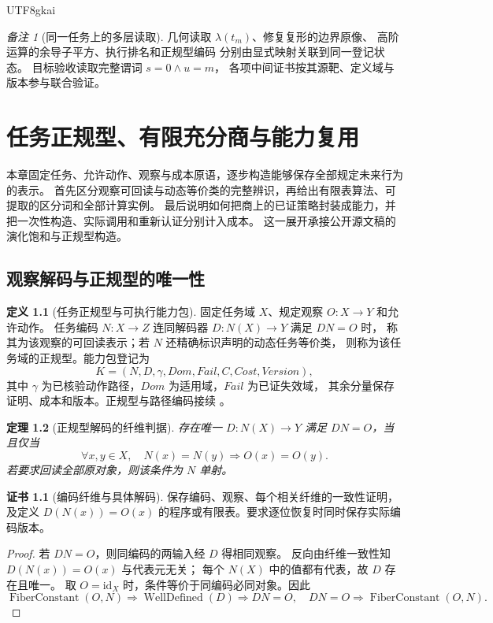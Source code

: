 \documentclass[12pt,a4paper,openany,notitlepage]{report}
\theoremstyle{plain}
\newtheorem{theorem}{定理}[chapter]
\theoremstyle{definition}
\newtheorem{definition}[theorem]{定义}
\newtheorem*{certificate}{证书}
\theoremstyle{remark}
\newtheorem{remark}[theorem]{备注}
\def\mathcal#1{#1}\def\mathsf#1{#1}\def\mathbb#1{#1}%
\begin{document}
\begin{CJK*}{UTF8}{gkai}
\begin{remark}[同一任务上的多层读取]
几何读取 $\lambda(t_m)$、修复复形的边界原像、
高阶运算的余导子平方、执行排名和正规型编码
分别由显式映射关联到同一登记状态。
目标验收读取完整谓词 $s=0\land u=m$，
各项中间证书按其源靶、定义域与版本参与联合验证。
\end{remark}


\chapter{任务正规型、有限充分商与能力复用}
\label{exp:ch:normalform}

\label{hgov:sec:normalform}

本章固定任务、允许动作、观察与成本原语，逐步构造能够保存全部规定未来行为的表示。
首先区分观察可回读与动态等价类的完整辨识，再给出有限表算法、可提取的区分词和全部计算实例。
最后说明如何把商上的已证策略封装成能力，并把一次性构造、实际调用和重新认证分别计入成本。
这一展开承接公开源文稿的演化饱和与正规型构造\cite{S19,S38,GFrameworkSynthesis}。

\section{观察解码与正规型的唯一性}
\label{exp:gov:normalform-section}

\begin{definition}[任务正规型与可执行能力包]
\label{hgov:def:normalform}
固定任务域 $X$、规定观察 $O:X\to Y$ 和允许动作。
任务编码 $N:X\to Z$ 连同解码器 $D:N(X)\to Y$ 满足 $DN=O$ 时，
称其为该观察的可回读表示；若 $N$ 还精确标识声明的动态任务等价类，
则称为该任务域的正规型。能力包登记为
\[
\mathcal K=(N,D,\gamma,\mathsf{Dom},\mathsf{Fail},\mathcal C,
\mathsf{Cost},\mathsf{Version}),
\]
其中 $\gamma$ 为已核验动作路径，$\mathsf{Dom}$ 为适用域，$\mathsf{Fail}$ 为已证失效域，
其余分量保存证明、成本和版本。正规型与路径编码接续
\cite{S19,S38,GFrameworkSynthesis}。
\end{definition}

\begin{theorem}[正规型解码的纤维判据]
\label{hgov:thm:nf}
存在唯一 $D:N(X)\to Y$ 满足 $DN=O$，当且仅当
\[
\forall x,y\in X,\quad N(x)=N(y)\Rightarrow O(x)=O(y).
\]
若要求回读全部原对象，则该条件为 $N$ 单射。
\end{theorem}
\begin{certificate}[编码纤维与具体解码]
保存编码、观察、每个相关纤维的一致性证明，及定义
$D(N(x))=O(x)$ 的程序或有限表。要求逐位恢复时同时保存实际编码版本。
\end{certificate}
\begin{proof}
若 $DN=O$，则同编码的两输入经 $D$ 得相同观察。
反向由纤维一致性知 $D(N(x))=O(x)$ 与代表元无关；
每个 $N(X)$ 中的值都有代表，故 $D$ 存在且唯一。
取 $O=\mathrm{id}_X$ 时，条件等价于同编码必同对象。因此
\[
\operatorname{FiberConstant}(O,N)
\Rightarrow\operatorname{WellDefined}(D)
\Rightarrow DN=O,
\quad
DN=O\Rightarrow\operatorname{FiberConstant}(O,N).
\]
\end{proof}


\end{CJK*}
\end{document}
